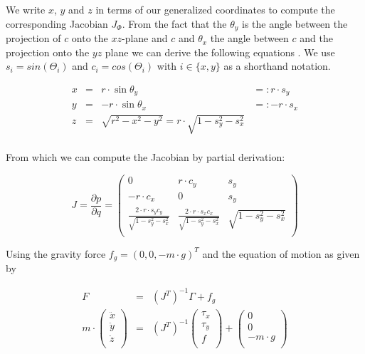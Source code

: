 \documentclass[english,ngerman]{KITreprt}
\begin{document}
We write $x$, $y$ and $z$ in terms of our generalized coordinates to
compute the corresponding Jacobian $J_\Phi$. From the fact that the
$\theta_y$ is the angle between the projection of $c$ onto the
$xz$-plane and $c$ and $\theta_x$ the angle between $c$ and the
projection onto the $yz$ plane we can derive the following equations
\cite{kajita20013d}. We use $s_i = sin(\Theta_i)$ and
$c_i = cos(\Theta_i)$ with $i \in \{x, y\}$ as a shorthand notation.

\begin{equation}
\begin{array}{lcll} \label{eq:lip-xyz}
x & = & r \cdot \sin \theta_y & =: r \cdot s_y\\
y & = & -r \cdot \sin \theta_x & =: -r \cdot s_x \\
z & = & \sqrt{r^2 - x^2 - y^2} = r \cdot \sqrt{1 - s_y^2 - s_x^2} & \\
\end{array}
\end{equation}

From which we can compute the Jacobian by partial derivation:

\begin{equation} \label{eq:lip-Jacobian}
J = \frac{\partial p}{\partial q} = \left( \begin{array}{rcl}
0 & r \cdot c_y & s_y \\
-r \cdot c_x & 0 & s_y \\
\frac{2 \cdot r \cdot s_y c_y}{\sqrt{1 - s_y^2 - s_x^2}} & \frac{2 \cdot r \cdot s_x c_x}{\sqrt{1 - s_y^2 - s_x^2}} & \sqrt{1 - s_y^2 - s_x^2}\\
\end{array}
\right)
\end{equation}

Using the gravity force $f_g = (0, 0, -m \cdot g)^T$ and the equation of
motion as given by

\begin{equation}
\begin{array}{lcr}
F & = & (J^T)^{-1} \Gamma + f_g \\
m \cdot
\left(\begin{array}{c}
\ddot x \\
\ddot y \\
\ddot z \\
\end{array}\right)
& = & (J^T)^{-1}
\left(\begin{array}{c}
\tau_x \\
\tau_y \\
f \\
\end{array}\right)
+
\left(\begin{array}{c}
0 \\
0 \\
-m \cdot g \\
\end{array}\right) \\
\end{array}
\end{equation}
\end{document}
